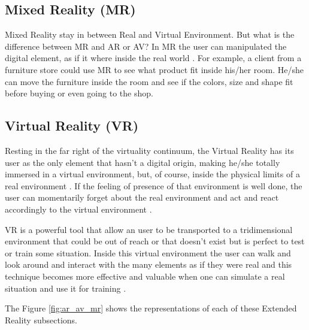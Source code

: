 \subsection{Mixed Reality (MR)}
\label{subsec:mixed_reality}

    Mixed Reality stay in between Real and Virtual Environment. But what is the difference between MR and AR or AV? In MR the user can manipulated the digital element, as if it where inside the real world \cite{doolani2020review}. For example, a client from a furniture store could use MR to see what product fit inside his/her room. He/she can move the furniture inside the room and see if the colors, size and shape fit before buying or even going to the shop.
    
\subsection{Virtual Reality (VR)}
\label{subsec:virtual_reality}

    Resting in the far right of the virtuality continuum, the Virtual Reality has its user as the only element that hasn't a digital origin, making he/she totally immersed in a virtual environment, but, of course, inside the physical limits of a real environment \cite{ma2007virtuality}. If the feeling of presence of that environment is well done, the user can momentarily forget about the real environment and act and react accordingly to the virtual environment \cite{farrell2018learning}. 
    
    VR is a powerful tool that allow an user to be transported to a tridimensional environment that could be out of reach or that doesn't exist but is perfect to test or train some situation. Inside this virtual environment the user can walk and look around and interact with the many elements as if they were real \cite{mujber2004virtual} and this technique becomes more effective and valuable when one can simulate a real situation and use it for training \cite{salah2019virtual}.
    
The Figure \ref{fig:ar_av_mr} shows the representations of each of these Extended Reality subsections.
    

    